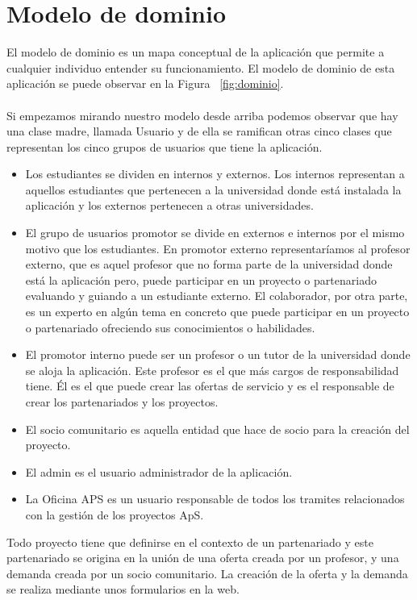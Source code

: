 \documentclass[11pt]{book}
\begin{document}
\section{Modelo de dominio}
El modelo de dominio es un mapa conceptual de la aplicación que permite a cualquier individuo entender su funcionamiento. El modelo de dominio de esta aplicación se puede observar en la Figura ~\ref{fig:dominio}.\\\\
Si empezamos mirando nuestro modelo desde arriba podemos observar que hay una clase madre, llamada Usuario y de ella se ramifican otras cinco clases que representan los cinco grupos de usuarios que tiene la aplicación.\\
\begin{itemize} 
	\item Los estudiantes se dividen en internos y externos. Los internos representan a aquellos estudiantes que pertenecen a la universidad donde está instalada la aplicación y los externos pertenecen a otras universidades.
	\item El grupo de usuarios promotor se divide en externos e internos por el mismo motivo que los estudiantes. 
	En promotor externo representaríamos al profesor externo, que es aquel profesor que no forma parte de la universidad donde está la aplicación pero, puede participar en un proyecto o partenariado evaluando y guiando a un estudiante externo. El colaborador, por otra parte, es un experto en algún tema en concreto que puede participar en un proyecto o partenariado ofreciendo sus conocimientos o habilidades.
	\item El promotor interno puede ser un profesor o un tutor de la universidad donde se aloja la aplicación. Este profesor es el que más cargos de responsabilidad tiene. Él es el que puede crear las ofertas de servicio y es el responsable de crear los partenariados y los proyectos.
	\item El socio comunitario es aquella entidad que hace de socio para la creación del proyecto.
	\item El admin es el usuario administrador de la aplicación.
	\item La Oficina APS es un usuario responsable de todos los tramites relacionados con la gestión de los proyectos ApS. 
\end{itemize}
Todo proyecto tiene que definirse en el contexto de un partenariado y este partenariado se origina en la unión de una oferta creada por un profesor, y una demanda creada por un socio comunitario. La creación de la oferta y la demanda se realiza mediante unos formularios en la web.\\
\end{document}
